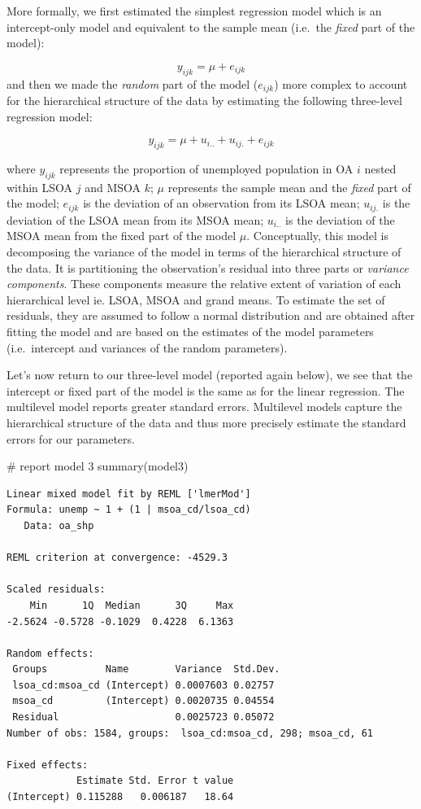 \documentclass[
  letterpaper,
  DIV=11,
  numbers=noendperiod,
  oneside]{scrreprt}
\newenvironment{Shaded}{\begin{snugshade}}{\end{snugshade}}
\newcommand{\CommentTok}[1]{\textcolor[rgb]{0.37,0.37,0.37}{#1}}
\newcommand{\FunctionTok}[1]{\textcolor[rgb]{0.28,0.35,0.67}{#1}}
\newcommand{\NormalTok}[1]{\textcolor[rgb]{0.00,0.23,0.31}{#1}}
\begin{document}
More formally, we first estimated the simplest regression model which is
an intercept-only model and equivalent to the sample mean (i.e.~the
\emph{fixed} part of the model):

\[y_{ijk} = \mu + e_{ijk}\] and then we made the \emph{random} part of
the model (\(e_{ijk}\)) more complex to account for the hierarchical
structure of the data by estimating the following three-level regression
model:

\[y_{ijk} = \mu + u_{i..} + u_{ij.} + e_{ijk}\]

where \(y_{ijk}\) represents the proportion of unemployed population in
OA \(i\) nested within LSOA \(j\) and MSOA \(k\); \(\mu\) represents the
sample mean and the \emph{fixed} part of the model; \(e_{ijk}\) is the
deviation of an observation from its LSOA mean; \(u_{ij.}\) is the
deviation of the LSOA mean from its MSOA mean; \(u_{i..}\) is the
deviation of the MSOA mean from the fixed part of the model \(\mu\).
Conceptually, this model is decomposing the variance of the model in
terms of the hierarchical structure of the data. It is partitioning the
observation's residual into three parts or \emph{variance components}.
These components measure the relative extent of variation of each
hierarchical level ie. LSOA, MSOA and grand means. To estimate the set
of residuals, they are assumed to follow a normal distribution and are
obtained after fitting the model and are based on the estimates of the
model parameters (i.e.~intercept and variances of the random
parameters).

Let's now return to our three-level model (reported again below), we see
that the intercept or fixed part of the model is the same as for the
linear regression. The multilevel model reports greater standard errors.
Multilevel models capture the hierarchical structure of the data and
thus more precisely estimate the standard errors for our parameters.

\begin{Shaded}
\begin{Highlighting}[]
\CommentTok{\# report model 3}
\FunctionTok{summary}\NormalTok{(model3)}
\end{Highlighting}
\end{Shaded}

\begin{verbatim}
Linear mixed model fit by REML ['lmerMod']
Formula: unemp ~ 1 + (1 | msoa_cd/lsoa_cd)
   Data: oa_shp

REML criterion at convergence: -4529.3

Scaled residuals: 
    Min      1Q  Median      3Q     Max 
-2.5624 -0.5728 -0.1029  0.4228  6.1363 

Random effects:
 Groups          Name        Variance  Std.Dev.
 lsoa_cd:msoa_cd (Intercept) 0.0007603 0.02757 
 msoa_cd         (Intercept) 0.0020735 0.04554 
 Residual                    0.0025723 0.05072 
Number of obs: 1584, groups:  lsoa_cd:msoa_cd, 298; msoa_cd, 61

Fixed effects:
            Estimate Std. Error t value
(Intercept) 0.115288   0.006187   18.64
\end{verbatim}
\end{document}
